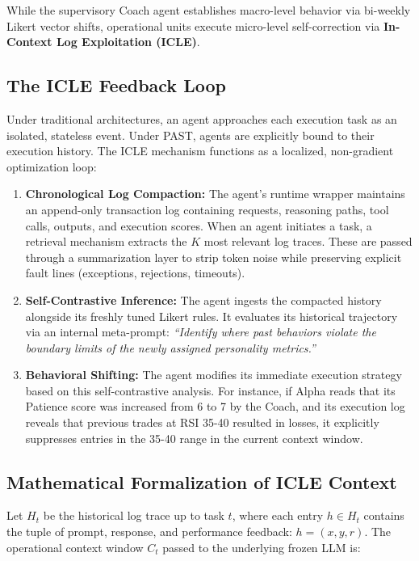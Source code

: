 \documentclass[11pt]{article}
\begin{document}
While the supervisory Coach agent establishes macro-level behavior via bi-weekly Likert vector shifts, operational units execute micro-level self-correction via \textbf{In-Context Log Exploitation (ICLE)}.

\subsection{The ICLE Feedback Loop}\label{the-icle-feedback-loop}

Under traditional architectures, an agent approaches each execution task as an isolated, stateless event. Under PAST, agents are explicitly bound to their execution history. The ICLE mechanism functions as a localized, non-gradient optimization loop:

\begin{enumerate}
\def\labelenumi{\arabic{enumi}.}
\item
  \textbf{Chronological Log Compaction:} The agent's runtime wrapper maintains an append-only transaction log containing requests, reasoning paths, tool calls, outputs, and execution scores. When an agent initiates a task, a retrieval mechanism extracts the \(K\) most relevant log traces. These are passed through a summarization layer to strip token noise while preserving explicit fault lines (exceptions, rejections, timeouts).
\item
  \textbf{Self-Contrastive Inference:} The agent ingests the compacted history alongside its freshly tuned Likert rules. It evaluates its historical trajectory via an internal meta-prompt: \emph{``Identify where past behaviors violate the boundary limits of the newly assigned personality metrics.''}
\item
  \textbf{Behavioral Shifting:} The agent modifies its immediate execution strategy based on this self-contrastive analysis. For instance, if Alpha reads that its Patience score was increased from 6 to 7 by the Coach, and its execution log reveals that previous trades at RSI 35-40 resulted in losses, it explicitly suppresses entries in the 35-40 range in the current context window.
\end{enumerate}

\subsection{Mathematical Formalization of ICLE Context}\label{mathematical-formalization-of-icle-context}

Let \(H_t\) be the historical log trace up to task \(t\), where each entry \(h \in H_t\) contains the tuple of prompt, response, and performance feedback: \(h = (x, y, r)\). The operational context window \(C_t\) passed to the underlying frozen LLM is:
\end{document}
